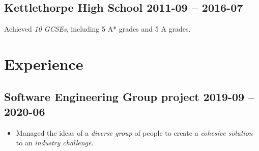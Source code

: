 \documentclass[cv.tex]{subfiles}
\begin{document}
    \subsection{Kettlethorpe High School
       \hfill 2011-09 -- 2016-07}
       Achieved \emph{10 GCSEs}, including 5 A* grades and 5 A
       grades\footnotemark[2].
\section{Experience}
    \subsection{Software Engineering Group project
    \hfill 2019-09 -- 2020-06}
        \begin{itemize}
            \item Managed the ideas of a \emph{diverse group} of people to
                create a \emph{cohesive solution} to an \emph{industry
                challenge}.
        \end{itemize}
\end{document}
